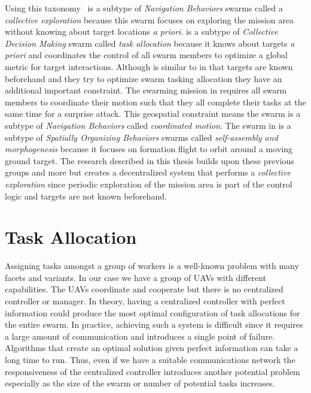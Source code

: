 Using this taxonomy~\citet{jin} is a subtype of \textit{Navigation Behaviors} swarms called a \textit{collective exploration} because this swarm focuses on exploring the mission area without knowing about target locations \textit{a priori}.  \citet{bellingham} is a subtype of \textit{Collective Decision Making} swarm called \textit{task allocation}  because it knows about targets \textit{a priori} and coordinates the control of all swarm members to optimize a global metric for target interactions.  Although \citet{beard} is similar to \citet{bellingham} in that targets are known beforehand and they try to optimize swarm tasking allocation they have an additional important constraint.  The swarming mission in \citet{beard} requires all swarm members to coordinate their motion such that they all complete their tasks at the same time for a surprise attack. This geospatial constraint means the swarm is a subtype of \textit{Navigation Behaviors} called \textit{coordinated motion}.  The swarm in \citet{wheeler} is a subtype of \textit{Spatially Organizing Behaviors} swarms called \textit{self-assembly and morphogenesis} because it focuses on formation flight to orbit around a moving ground target.  The research described in this thesis builds upon these previous groups and more but creates a decentralized system that performs a \textit{collective exploration} since periodic exploration of the mission area is part of the control logic and targets are not known beforehand.

\section{Task Allocation}
\label{sec:uncoordTaskingRelated}

Assigning tasks amongst a group of workers is a well-known problem with many facets and variants.  In our case we have a group of UAVs with different capabilities.  The UAVs coordinate and cooperate but there is no centralized controller or manager.   In theory, having a centralized controller with perfect information could produce the most optimal configuration of task allocations for the entire swarm.  In practice, achieving such a system is difficult since it requires a large amount of communication and introduces a single point of failure.  Algorithms that create an optimal solution given perfect information can take a long time to run.  Thus, even if we have a suitable communications network the responsiveness of the centralized controller introduces another potential problem especially as the size of the swarm or number of potential tasks increases.

